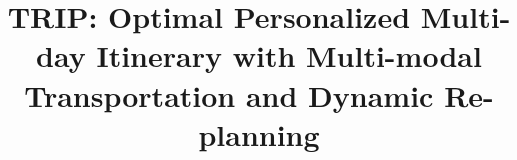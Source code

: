 \documentclass[sigconf,review]{acmart}
\newcommand{\ignore}[1]{}
\begin{document}
\title
{TRIP: Optimal Personalized Multi-day Itinerary with Multi-modal Transportation and Dynamic Re-planning}




\ignore{

\author{
\IEEEauthorblockN{Priyanshu Jha\IEEEauthorrefmark{1}}
\IEEEauthorblockA{\textit{Computer Science and Engineering} \\
\textit{Indian Institute of Technology Kanpur}\\
Kanpur, India \\
priyanshu.jha.1973@gmail.com
}
\and
\IEEEauthorblockN{Neelu Lalchandani\IEEEauthorrefmark{1}}
\IEEEauthorblockA{\textit{Computer Science and Engineering} \\
\textit{Indian Institute of Technology Kanpur}\\
Kanpur, India \\
neelulalchandani29@gmail.com
}
\and
\IEEEauthorblockN{Shubhadip Mitra}
\IEEEauthorblockA{\textit{Blue Yonder India Pvt. Ltd.} \\
\textit{Bengaluru}\\
Bengaluru, India \\
shubhadip.mitra@blueyonder.com}
\and
\IEEEauthorblockN{Arnab Bhattacharya}
\IEEEauthorblockA{\textit{Computer Science and Engineering} \\
\textit{Indian Institute of Technology Kanpur}\\
Kanpur, India \\
arnabb@cse.iitk.ac.in
\and
\IEEEauthorblockN{Oswald C}
\IEEEauthorblockA{\textit{Computer Science and Engineering} \\
\textit{National Institute of Technology Tiruchirappalli}\\
Tiruchirappalli, India \\
oswald@nitt.edu }
\and
\IEEEauthorblockN{Arindam Pal}
\IEEEauthorblockA{\textit{TechSoftX Corporation}\\
Sydney, NSW, Australia \\
arindamp@techsoftx.com.au}
\and
\IEEEauthorblockA{\IEEEauthorrefmark{1}Both authors contributed equally to this
work}
}
}
}
\end{document}
